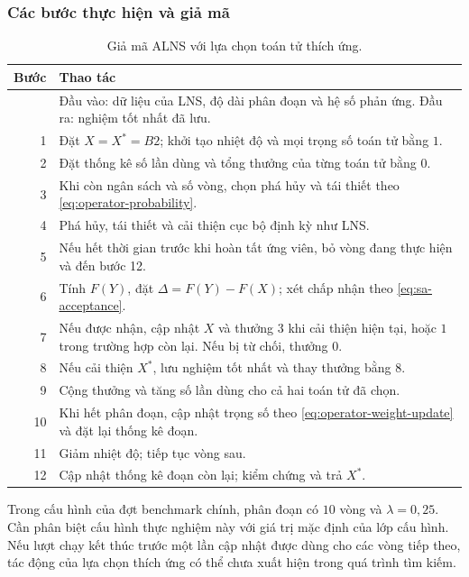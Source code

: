 \subsubsection{Các bước thực hiện và giả mã}
\begin{table}[H]
\centering\small
\begin{tabularx}{\linewidth}{rX}
\toprule
Bước & Thao tác \\
\midrule
 & Đầu vào: dữ liệu của LNS, độ dài phân đoạn và hệ số phản ứng. Đầu ra: nghiệm tốt nhất đã lưu. \\
1 & Đặt $X=X^*=B2$; khởi tạo nhiệt độ và mọi trọng số toán tử bằng $1$. \\
2 & Đặt thống kê số lần dùng và tổng thưởng của từng toán tử bằng $0$. \\
3 & Khi còn ngân sách và số vòng, chọn phá hủy và tái thiết theo \eqref{eq:operator-probability}. \\
4 & Phá hủy, tái thiết và cải thiện cục bộ định kỳ như LNS. \\
5 & Nếu hết thời gian trước khi hoàn tất ứng viên, bỏ vòng đang thực hiện và đến bước 12. \\
6 & Tính $F(Y)$, đặt $\Delta=F(Y)-F(X)$; xét chấp nhận theo \eqref{eq:sa-acceptance}. \\
7 & Nếu được nhận, cập nhật $X$ và thưởng $3$ khi cải thiện hiện tại, hoặc $1$ trong trường hợp còn lại. Nếu bị từ chối, thưởng $0$. \\
8 & Nếu cải thiện $X^*$, lưu nghiệm tốt nhất và thay thưởng bằng $8$. \\
9 & Cộng thưởng và tăng số lần dùng cho cả hai toán tử đã chọn. \\
10 & Khi hết phân đoạn, cập nhật trọng số theo \eqref{eq:operator-weight-update} và đặt lại thống kê đoạn. \\
11 & Giảm nhiệt độ; tiếp tục vòng sau. \\
12 & Cập nhật thống kê đoạn còn lại; kiểm chứng và trả $X^*$. \\
\bottomrule
\end{tabularx}
\caption{Giả mã ALNS với lựa chọn toán tử thích ứng.}\label{tab:alns-pseudocode}
\end{table}
Trong cấu hình của đợt benchmark chính, phân đoạn có $10$ vòng và $\lambda=0{,}25$. Cần phân biệt cấu hình thực nghiệm này với giá trị mặc định của lớp cấu hình. Nếu lượt chạy kết thúc trước một lần cập nhật được dùng cho các vòng tiếp theo, tác động của lựa chọn thích ứng có thể chưa xuất hiện trong quá trình tìm kiếm.

